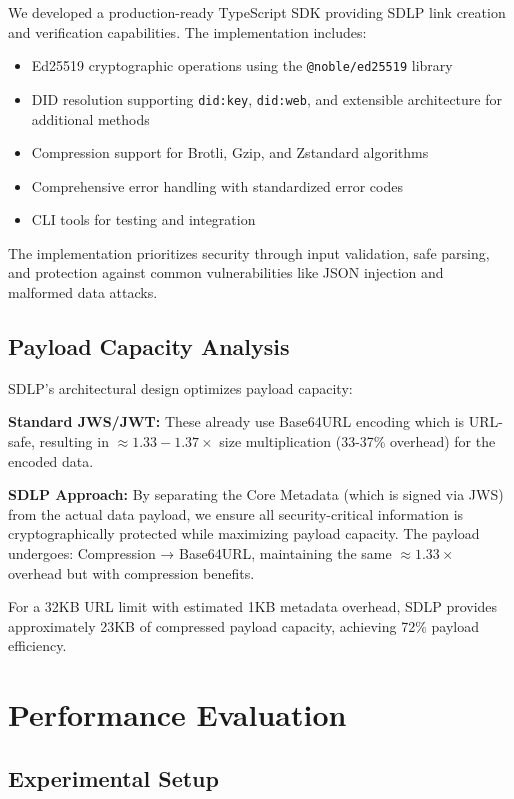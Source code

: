 \documentclass[conference]{IEEEtran}
\begin{document}
We developed a production-ready TypeScript SDK providing SDLP link creation and verification capabilities. The implementation includes:

\begin{itemize}
    \item Ed25519 cryptographic operations using the \texttt{@noble/ed25519} library
    \item DID resolution supporting \texttt{did:key}, \texttt{did:web}, and extensible architecture for additional methods
    \item Compression support for Brotli, Gzip, and Zstandard algorithms
    \item Comprehensive error handling with standardized error codes
    \item CLI tools for testing and integration
\end{itemize}

The implementation prioritizes security through input validation, safe parsing, and protection against common vulnerabilities like JSON injection and malformed data attacks.

\subsection{Payload Capacity Analysis}

SDLP's architectural design optimizes payload capacity:

\textbf{Standard JWS/JWT:} These already use Base64URL encoding which is URL-safe, resulting in $\approx 1.33-1.37\times$ size multiplication (33-37\% overhead) for the encoded data.

\textbf{SDLP Approach:} By separating the Core Metadata (which is signed via JWS) from the actual data payload, we ensure all security-critical information is cryptographically protected while maximizing payload capacity. The payload undergoes: Compression → Base64URL, maintaining the same $\approx 1.33\times$ overhead but with compression benefits.

For a 32KB URL limit with estimated 1KB metadata overhead, SDLP provides approximately 23KB of compressed payload capacity, achieving 72\% payload efficiency.

\section{Performance Evaluation}

\subsection{Experimental Setup}
\end{document}
